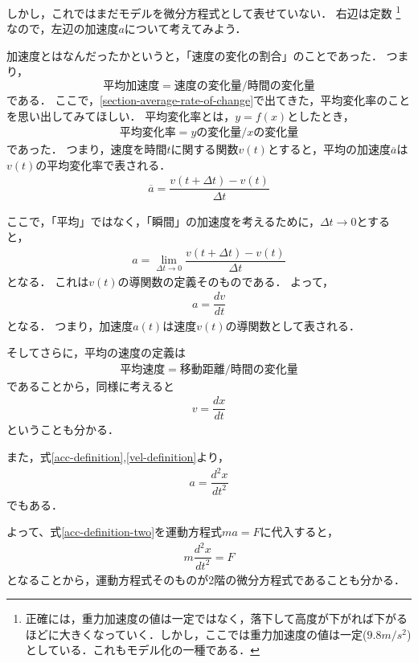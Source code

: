 しかし，これではまだモデルを微分方程式として表せていない．
右辺は定数
\footnote{正確には，重力加速度の値は一定ではなく，落下して高度が下がれば下がるほどに大きくなっていく．しかし，ここでは重力加速度の値は一定($9.8m/s^2$)としている．これもモデル化の一種である．}
なので，左辺の加速度$a$について考えてみよう．


加速度とはなんだったかというと，「速度の変化の割合」のことであった．
つまり，
\begin{equation}
平均加速度 = 速度の変化量　/　時間の変化量
\end{equation}
である．
ここで，\ref{section-average-rate-of-change}で出てきた，平均変化率のことを思い出してみてほしい．
平均変化率とは，$y=f(x)$としたとき，
\begin{align}
平均変化率　=　yの変化量　/　xの変化量
\end{align}
であった．
つまり，速度を時間$t$に関する関数$v(t)$とすると，平均の加速度$\overline{a}$は$v(t)$の平均変化率で表される．
\begin{align}
\overline{a} = \dfrac{v(t+\Delta t)-v(t)}{\Delta t}
\end{align}

ここで，「平均」ではなく，「瞬間」の加速度を考えるために，$\Delta t \to 0$とすると，
\begin{align}
a = \lim_{\Delta t \to 0} \dfrac{v(t+\Delta t)-v(t)}{\Delta t}
\end{align}
となる．
これは$v(t)$の導関数の定義そのものである．
よって，
\begin{align}
a = \dfrac{dv}{dt}
\label{acc-definition}
\end{align}
となる．
つまり，加速度$a(t)$は速度$v(t)$の導関数として表される．


そしてさらに，平均の速度の定義は
\begin{align}
平均速度　=　移動距離　/　時間の変化量
\end{align}
であることから，同様に考えると
\begin{align}
v = \dfrac{dx}{dt}
\label{vel-definition}
\end{align}
ということも分かる．


また，式\ref{acc-definition},\ref{vel-definition}より，
\begin{align}
a = \dfrac{d^2 x}{dt^2}
\label{acc-definition-two}
\end{align}
でもある．

よって、式\ref{acc-definition-two}を運動方程式$ma = F$に代入すると，
\begin{align}
m \dfrac{d^2 x}{dt^2} = F
\end{align}
となることから，運動方程式そのものが2階の微分方程式であることも分かる．


